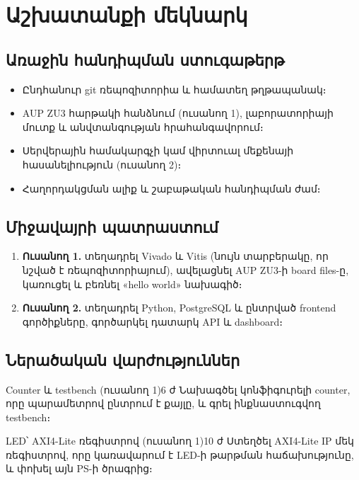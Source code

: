 \chapter{Աշխատանքի մեկնարկ}
\label{ch:start}

\section{Առաջին հանդիպման ստուգաթերթ}
\begin{itemize}
  \item Ընդհանուր git ռեպոզիտորիա և համատեղ թղթապանակ։
  \item AUP ZU3 հարթակի հանձնում (ուսանող 1), լաբորատորիայի մուտք և անվտանգության հրահանգավորում։
  \item Սերվերային համակարգչի կամ վիրտուալ մեքենայի հասանելիություն (ուսանող 2)։
  \item Հաղորդակցման ալիք և շաբաթական հանդիպման ժամ։
\end{itemize}

\section{Միջավայրի պատրաստում}
\begin{enumerate}
  \item \textbf{Ուսանող 1.} տեղադրել Vivado և Vitis (նույն տարբերակը, որ նշված է ռեպոզիտորիայում), ավելացնել AUP ZU3-ի board files-ը, կառուցել և բեռնել «hello world» նախագիծ։
  \item \textbf{Ուսանող 2.} տեղադրել Python, PostgreSQL և ընտրված frontend գործիքները, գործարկել դատարկ API և dashboard։
\end{enumerate}

\section{Ներածական վարժություններ}
\begin{warmup}{Counter և testbench (ուսանող 1)}{6 ժ}
  Նախագծել կոնֆիգուրելի counter, որը պարամետրով ընտրում է քայլը, և գրել ինքնաստուգվող testbench։
\end{warmup}

\begin{warmup}{LED՝ AXI4-Lite ռեգիստրով (ուսանող 1)}{10 ժ}
  Ստեղծել AXI4-Lite IP մեկ ռեգիստրով, որը կառավարում է LED-ի թարթման հաճախությունը, և փոխել այն PS-ի ծրագրից։
\end{warmup}

